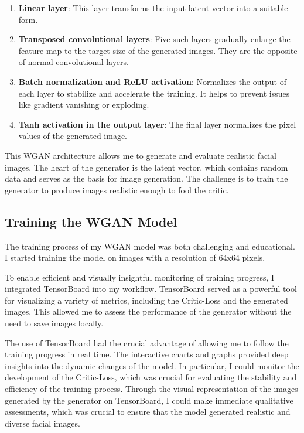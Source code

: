 \documentclass[a4paper, 12pt]{article}
\begin{document}
\begin{enumerate}
    \item \textbf{Linear layer}: This layer transforms the input latent vector into a suitable form.
    \item \textbf{Transposed convolutional layers}: Five such layers gradually enlarge the feature map to the target size of the generated images. They are the opposite of normal convolutional layers.
    \item \textbf{Batch normalization and ReLU activation}: Normalizes the output of each layer to stabilize and accelerate the training. It helps to prevent issues like gradient vanishing or exploding.
    \item \textbf{Tanh activation in the output layer}: The final layer normalizes the pixel values of the generated image.
\end{enumerate}

This WGAN architecture allows me to generate and evaluate realistic facial images. The heart of the generator is the latent vector, which contains random data and serves as the basis for image generation. The challenge is to train the generator to produce images realistic enough to fool the critic.

\subsection{Training the WGAN Model}
The training process of my WGAN model was both challenging and educational. I started training the model on images with a resolution of 64x64 pixels.

To enable efficient and visually insightful monitoring of training progress, I integrated TensorBoard into my workflow. TensorBoard served as a powerful tool for visualizing a variety of metrics, including the Critic-Loss and the generated images. This allowed me to assess the performance of the generator without the need to save images locally.

The use of TensorBoard had the crucial advantage of allowing me to follow the training progress in real time. The interactive charts and graphs provided deep insights into the dynamic changes of the model. In particular, I could monitor the development of the Critic-Loss, which was crucial for evaluating the stability and efficiency of the training process. Through the visual representation of the images generated by the generator on TensorBoard, I could make immediate qualitative assessments, which was crucial to ensure that the model generated realistic and diverse facial images.
\end{document}
